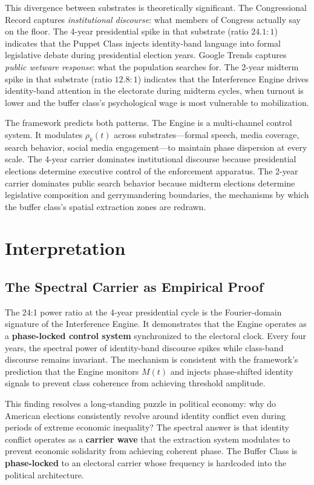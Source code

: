 This divergence between substrates is theoretically significant. The Congressional Record captures \textit{institutional discourse}: what members of Congress actually say on the floor. The 4-year presidential spike in that substrate (ratio $24.1:1$) indicates that the Puppet Class injects identity-band language into formal legislative debate during presidential election years. Google Trends captures \textit{public wetware response}: what the population searches for. The 2-year midterm spike in that substrate (ratio $12.8:1$) indicates that the Interference Engine drives identity-band attention in the electorate during midterm cycles, when turnout is lower and the buffer class's psychological wage is most vulnerable to mobilization.

The framework predicts both patterns. The Engine is a multi-channel control system. It modulates $\rho_k(t)$ across substrates---formal speech, media coverage, search behavior, social media engagement---to maintain phase dispersion at every scale. The 4-year carrier dominates institutional discourse because presidential elections determine executive control of the enforcement apparatus. The 2-year carrier dominates public search behavior because midterm elections determine legislative composition and gerrymandering boundaries, the mechanisms by which the buffer class's spatial extraction zones are redrawn.

\section{Interpretation}

\subsection{The Spectral Carrier as Empirical Proof}

The 24:1 power ratio at the 4-year presidential cycle is the Fourier-domain signature of the Interference Engine. It demonstrates that the Engine operates as a \textbf{phase-locked control system} synchronized to the electoral clock. Every four years, the spectral power of identity-band discourse spikes while class-band discourse remains invariant. The mechanism is consistent with the framework's prediction that the Engine monitors $M(t)$ and injects phase-shifted identity signals to prevent class coherence from achieving threshold amplitude.

This finding resolves a long-standing puzzle in political economy: why do American elections consistently revolve around identity conflict even during periods of extreme economic inequality? The spectral answer is that identity conflict operates as a \textbf{carrier wave} that the extraction system modulates to prevent economic solidarity from achieving coherent phase. The Buffer Class is \textbf{phase-locked} to an electoral carrier whose frequency is hardcoded into the political architecture.

